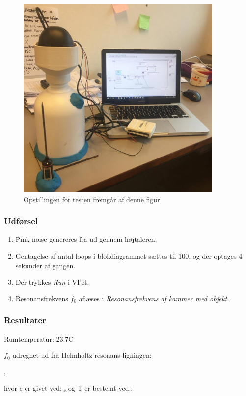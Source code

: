 {	\begin{figure}[htb]
	\centering
		\includegraphics[width=4in]{bordtest61.jpg}	
		\caption{Opstillingen for testen fremgår af denne figur}
		\label{bordetest61op}
	\end{figure}
	
		\subsubsection{Udførsel}
			
			\begin{enumerate}
			\item Pink noise genereres fra \onlineg  ud gennem højtaleren. 
			\item Gentagelse af antal loops i blokdiagrammet sættes til 100, og der optages 4 sekunder af gangen. 
			\item Der trykkes \textit{Run} i VI'et. 
			\item Resonansfrekvens $f_{0}$ aflæses i \textit{Resonansfrekvens af kammer med objekt}.
			\end{enumerate}
			
	\subsubsection{Resultater}
	
	Rumtemperatur: 23.7\degree C
	
	$f_{0}$ udregnet ud fra Helmholtz resonans ligningen:
	
		\fnul,
		
		hvor c er givet ved: 
		\c, og T er bestemt ved.: 
		\T
		
}
